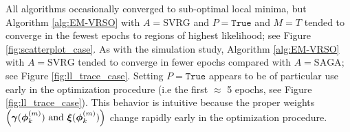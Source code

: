 %
All algorithms occasionally converged to sub-optimal local minima, but Algorithm \ref{alg:EM-VRSO} with $A = \text{SVRG}$ and $P=\texttt{True}$ and $M=T$ tended to converge in the fewest epochs to regions of highest likelihood; see Figure \ref{fig:scatterplot_case}. As with the simulation study, Algorithm \ref{alg:EM-VRSO} with $A = \text{SVRG}$ tended to converge in fewer epochs compared with $A=\text{SAGA}$; see Figure \ref{fig:ll_trace_case}. Setting $P = \texttt{True}$ appears to be of particular use early in the optimization procedure (i.e the first $\approx$ 5 epochs, see Figure \ref{fig:ll_trace_case}). This behavior is intuitive because the proper weights $\left(\boldsymbol{\gamma}(\boldsymbol{\phi}_k^{(m)}) ~ \text{and} ~ \boldsymbol{\xi}(\boldsymbol{\phi}_k^{(m)})\right)$ change rapidly early in the optimization procedure. 


%
%


